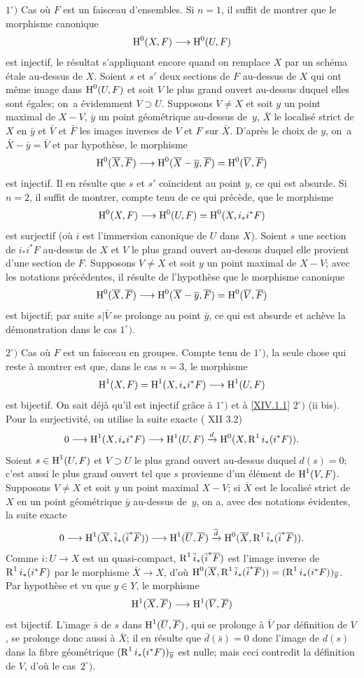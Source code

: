 $1^\circ)$ Cas o\`u $F$ est un faisceau d'ensembles. Si $n=1$, il suffit de montrer que le morphisme canonique
$$
\H^0(X, F)\to \H^0(U, F)$$
est injectif, le r\'esultat s'appliquant encore quand on remplace $X$ par un sch\'ema \'etale au-dessus de $X$. Soient $s$ et $s'$ deux sections de $F$ au-dessus de $X$ qui ont m\^eme image dans $\operatorname{H}^0(U, F)$ et soit $V$ le plus grand ouvert au-dessus duquel elles sont \'egales; on~a \'evidemment $V\supset U$. Supposons $V\neq X$ et soit $y$ un point maximal de $X-V$, $\bar y$ un point g\'eom\'etrique au-dessus de~$y$, $\bar X$ le localis\'e strict de $X$ en $\bar y$ et $\bar V$ et $\bar F$ les images inverses de $V$ et $F$ sur $\bar X$. D'apr\`es le choix de $y$, on~a $\bar X-\bar y=\bar V$ et par hypoth\`ese, le morphisme
$$
\H^0(\bar X, \bar F)\to \H^0(\bar X-\bar y, \bar F)=\H^0(\bar V, \bar F)$$
est injectif. Il en r\'esulte que $s$ et $s'$ co\"incident au point $y$, ce qui est absurde. Si $n=2$, il suffit de montrer, compte tenu de ce qui pr\'ec\`ede, que le morphisme
$$
\H^0(X, F)\to \H^0(U, F)=\H^0(X, i_*i^*F)$$
est surjectif (o\`u $i$ est l'immersion canonique de $U$ dans $X$). Soient $s$ une section de $i_*i^*F$ au-dessus de $X$ et $V$ le plus grand ouvert au-dessus duquel elle provient d'une section de $F$. Supposons $V\neq X$ et soit $y$ un point maximal de $X-V$; avec les notations pr\'ec\'edentes, il r\'esulte de l'hypoth\`ese que le morphisme canonique
$$
\H^0(\bar X, \bar F)\to \H^0(\bar X-\bar y, \bar F)=\H^0(\bar V, \bar F)
$$
est bijectif; par suite $s|\bar V$ se prolonge au point $\bar y$, ce qui est absurde et ach\`eve la d\'emonstration dans le cas $1^\circ)$.

$2^\circ)$ Cas o\`u $F$ est un faisceau en groupes. Compte tenu de $1^\circ)$, la seule chose qui reste \`a montrer est que, dans le cas $n=3$, le morphisme
$$
\H^1(X, F)=\H^1(X, i_*i^*F)\to \H^1(U, F)$$
est bijectif. On sait d\'ej\`a qu'il est injectif gr\^ace \`a $1^\circ)$ et \`a \ref{XIV.1.1} $2^\circ)$ (ii bis). Pour la surjectivit\'e, on utilise la suite exacte ( XII 3.2)
$$
0\to \H^1(X, i_*i^*F)\to \H^1(U, F)\lto{d}\H^0(X, \R^1i_*(i^*F)).
$$
Soient $s\in \operatorname{H}^1(U, F)$ et $V\supset U$ le plus grand ouvert au-dessus duquel $d(s)=0$; c'est aussi le plus grand ouvert tel que $s$ provienne d'un \'el\'ement de $\operatorname{H}^1(V, F)$. Supposons $V\neq X$ et soit $y$ un point maximal $X-V$; si $\bar X$ est le localis\'e strict de $X$ en un point g\'eom\'etrique $\bar y$ au-dessus de~$y$, on a, avec des notations \'evidentes, la suite exacte
$$
0\to \H^1(\bar X, \bar i_*(\bar i^*\bar F))\to \H^1(\bar U, \bar F)\lto{\bar d}\H^0(\bar X, \R^1\bar i_*(\bar i^*\bar F)).
$$
Comme $i:U\to X$ est un quasi-compact, $\operatorname{R}^1\overline i_*(\overline i^*\overline F)$ est l'image inverse de $\operatorname{R}^1i_*(i^*F)$ par le morphisme $\bar X\to X$, d'o\`u $\operatorname{H}^0(\overline X, \operatorname{R}^1\overline i_*(\overline i^*\overline F))=(\operatorname{R}^1i_*(i^*F))_{\overline y}$. Par hypoth\`ese et vu que $y\in Y$, le morphisme
$$
\H^1(\bar X, \bar F)\to \H^1(\bar V, \bar F)
$$
est bijectif. L'image $\bar s$ de $s$ dans $\operatorname{H}^1(\overline U, \overline F)$, qui se prolonge \`a $\bar V$ par d\'efinition de $V$, se prolonge donc aussi \`a $\bar X$; il en r\'esulte que $\bar d(\bar s)=0$ donc l'image de $d(s)$ dans la fibre g\'eom\'etrique $(\operatorname{R}^1i_*(i^*F))_{\overline y}$ est nulle; mais ceci contredit la d\'efinition de $V$, d'o\`u le cas~$2^\circ)$.

